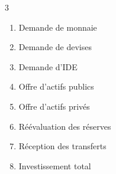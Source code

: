 \begin{table}[!h]
\begin{multicols}{3}
		\begin{enumerate}[font=\bfseries\sffamily,label=(\roman*),itemsep=4pt,parsep=0pt,topsep=0pt,leftmargin=*] 
			\item Demande de monnaie
			\item Demande de devises
			\item Demande d'IDE
			\item Offre d'actifs publics
			\item Offre d'actifs privés
			\item Réévaluation des réserves
			\item Réception des transferts
			\item Investissement total
		\end{enumerate}
	\end{multicols}
	\label{tab:FSAMformula}%
\end{table}%

